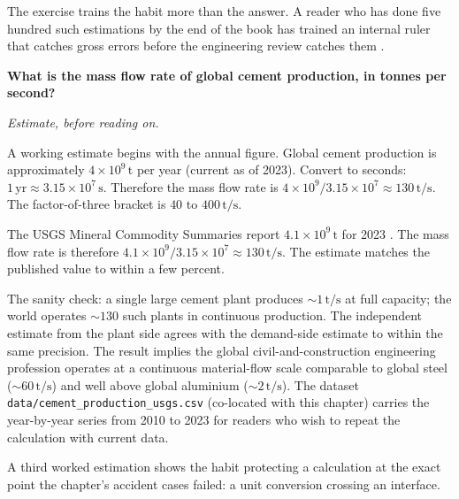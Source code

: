 The exercise trains the habit more than the answer. A reader who has
done five hundred such estimations by the end of the book has trained
an internal ruler that catches gross errors before the engineering
review catches them \cite{text:mahajan2014}.

\begin{estimation}
\textbf{What is the mass flow rate of global cement production, in
tonnes per second?}

\smallskip
\textit{Estimate, before reading on.}

\smallskip
A working estimate begins with the annual figure. Global cement
production is approximately $4 \times 10^9 \,\si{\tonne}$ per year
(current as of 2023). Convert to seconds: $1 \,\text{yr} \approx
3.15 \times 10^7 \,\si{\second}$. Therefore the mass flow rate is
$4 \times 10^9 / 3.15 \times 10^7 \approx 130 \,\si{\tonne\per
\second}$. The factor-of-three bracket is $40$ to $400 \,\si{\tonne
\per\second}$.

The USGS Mineral Commodity Summaries report $4.1 \times 10^9 \,\si{
\tonne}$ for 2023 \cite{data:usgs-mcs-cement-2024}. The mass flow
rate is therefore $4.1 \times 10^9 / 3.15 \times 10^7 \approx
130 \,\si{\tonne\per\second}$. The estimate matches the published
value to within a few percent.

The sanity check: a single large cement plant produces $\sim 1
\,\si{\tonne\per\second}$ at full capacity; the world operates
$\sim 130$ such plants in continuous production. The independent
estimate from the plant side agrees with the demand-side estimate
to within the same precision. The result implies the global
civil-and-construction engineering profession operates at a
continuous material-flow scale comparable to global steel ($\sim
60 \,\si{\tonne\per\second}$) and well above global aluminium
($\sim 2 \,\si{\tonne\per\second}$). The dataset
\texttt{data/cement\_production\_usgs.csv} (co-located with this
chapter) carries the year-by-year series from 2010 to 2023 for
readers who wish to repeat the calculation with current data.
\end{estimation}

A third worked estimation shows the habit protecting a calculation at
the exact point the chapter's accident cases failed: a unit conversion
crossing an interface.

